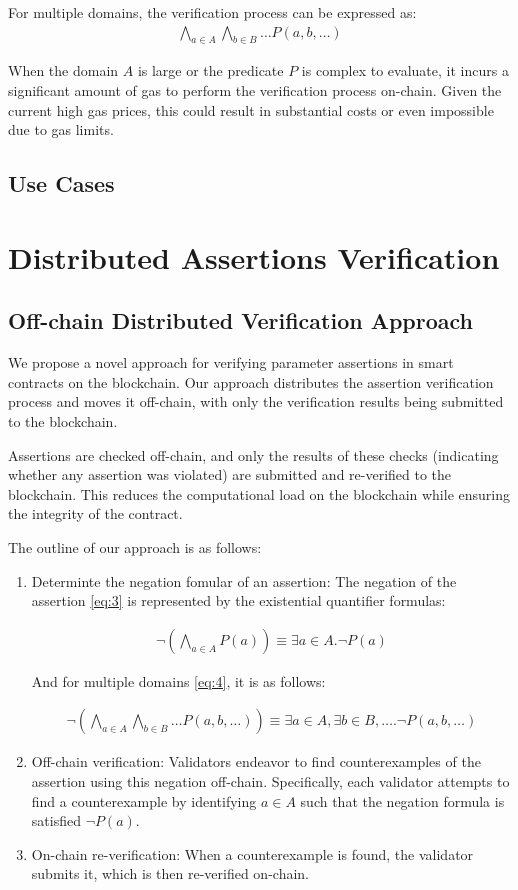 \documentclass[runningheads]{llncs}
\begin{document}
For multiple domains, the verification process can be expressed as:
\begin{gather}
  \label{eq:4}
  \bigwedge_{a \in A} \bigwedge_{b \in B} \dots P(a, b, \dots)
\end{gather}

When the domain $A$ is large or the predicate $P$ is complex to evaluate, it incurs a significant amount of gas to perform the verification process on-chain.  Given the current high gas prices, this could result in substantial costs or even impossible due to gas limits. 
\subsection{Use Cases}

\section{Distributed Assertions Verification}
\label{sec:distributed-assertion-verification}
\subsection{Off-chain Distributed Verification Approach}
We propose a novel approach for verifying parameter assertions in smart contracts on the blockchain. Our approach distributes the assertion verification process and moves it off-chain, with only the verification results being submitted to the blockchain.

Assertions are checked off-chain, and only the results of these checks (indicating whether any assertion was violated) are submitted and re-verified to the blockchain. This reduces the computational load on the blockchain while ensuring the integrity of the contract.

The outline of our approach is as follows:
\begin{enumerate}
\item Determinte the negation fomular of an assertion: The negation of the assertion \ref{eq:3} is represented by the existential quantifier formulas:

\begin{gather}
\label{eq:5}
\neg \left( \bigwedge_{a \in A} P(a) \right) \equiv \exists a \in A. \neg P(a)
\end{gather}

And for multiple domains \ref{eq:4}, it is as follows:

\begin{gather}
\label{eq:6}
\neg \left( \bigwedge_{a \in A} \bigwedge_{b \in B} \dots P(a, b, \dots) \right) \equiv \exists a \in A, \exists b \in B, \dots . \neg P(a, b, \dots)
\end{gather}
\item Off-chain verification: Validators endeavor to find counterexamples of the assertion using this negation off-chain. Specifically, each validator attempts to find a counterexample by identifying $a \in A$ such that the negation formula is satisfied $\neg P(a)$. 
\item On-chain re-verification: When a counterexample is found, the validator submits it, which is then re-verified on-chain. 
\end{enumerate}
\end{document}

